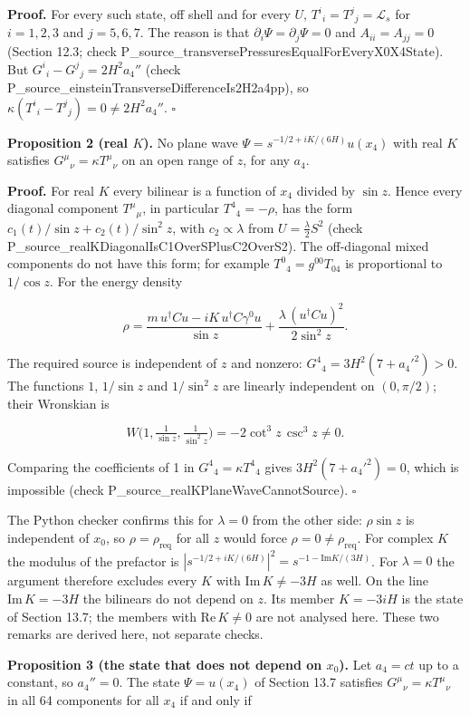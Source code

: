 \documentclass[11pt]{article}
\begin{document}
\textbf{Proof.} For every such state, off shell and for every $U$, $T^i{}_i=T^j{}_j=\mathcal L_s$ for $i=1,2,3$ and $j=5,6,7$. The reason is that $\partial_i\Psi=\partial_j\Psi=0$ and $A_{ii}=A_{jj}=0$ (Section 12.3; check P\_source\_transversePressuresEqualForEveryX0X4State). But $G^i{}_i-G^j{}_j=2H^2a_4''$ (check P\_source\_einsteinTransverseDifferenceIs2H2a4pp), so $\kappa(T^i{}_i-T^j{}_j)=0\ne2H^2a_4''$. $\square$

\textbf{Proposition 2 (real $K$).} No plane wave $\Psi=s^{-1/2+iK/(6H)}u(x_4)$ with real $K$ satisfies $G^\mu{}_\nu=\kappa T^\mu{}_\nu$ on an open range of $z$, for any $a_4$.

\textbf{Proof.} For real $K$ every bilinear is a function of $x_4$ divided by $\sin z$. Hence every diagonal component $T^\mu{}_\mu$, in particular $T^4{}_4=-\rho$, has the form $c_1(t)/\sin z+c_2(t)/\sin^2z$, with $c_2\propto\lambda$ from $U=\tfrac\lambda2S^2$ (check P\_source\_realKDiagonalIsC1OverSPlusC2OverS2). The off-diagonal mixed components do not have this form; for example $T^0{}_4=g^{00}T_{04}$ is proportional to $1/\cos z$. For the energy density

\[
\rho=\frac{m\,u^\dagger Cu-iK\,u^\dagger C\gamma^0u}{\sin z}+\frac{\lambda\,(u^\dagger Cu)^2}{2\sin^2z}.
\]

The required source is independent of $z$ and nonzero: $G^4{}_4=3H^2(7+a_4'^2)>0$. The functions $1$, $1/\sin z$ and $1/\sin^2z$ are linearly independent on $(0,\pi/2)$; their Wronskian is

\[
W\bigl(1,\tfrac1{\sin z},\tfrac1{\sin^2z}\bigr)=-2\cot^3z\,\csc^3z\ne0 .
\]

Comparing the coefficients of 1 in $G^4{}_4=\kappa T^4{}_4$ gives $3H^2(7+a_4'^2)=0$, which is impossible (check P\_source\_realKPlaneWaveCannotSource). $\square$

The Python checker confirms this for $\lambda=0$ from the other side: $\rho\sin z$ is independent of $x_0$, so $\rho=\rho_{\mathrm{req}}$ for all $z$ would force $\rho=0\ne\rho_{\mathrm{req}}$. For complex $K$ the modulus of the prefactor is $|s^{-1/2+iK/(6H)}|^2=s^{-1-\mathrm{Im}K/(3H)}$. For $\lambda=0$ the argument therefore excludes every $K$ with $\mathrm{Im}\,K\ne-3H$ as well. On the line $\mathrm{Im}\,K=-3H$ the bilinears do not depend on $z$. Its member $K=-3iH$ is the state of Section 13.7; the members with $\mathrm{Re}\,K\ne0$ are not analysed here. These two remarks are derived here, not separate checks.

\textbf{Proposition 3 (the state that does not depend on $x_0$).} Let $a_4=ct$ up to a constant, so $a_4''=0$. The state $\Psi=u(x_4)$ of Section 13.7 satisfies $G^\mu{}_\nu=\kappa T^\mu{}_\nu$ in all 64 components for all $x_4$ if and only if
\end{document}
